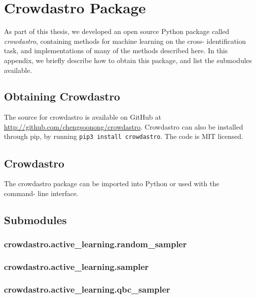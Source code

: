 
\appendix
\chapter{Crowdastro Package}

As part of this thesis, we developed an open source Python package called
\emph{crowdastro}, containing methods for machine learning on the cross-
identification task, and implementations of many of the methods described here.
In this appendix, we briefly describe how to obtain this package, and list the
submodules available.

\section{Obtaining Crowdastro}

    The source for crowdastro is available on GitHub at
    \url{http://github.com/chengsoonong/crowdastro}. Crowdastro can also be
    installed through pip, by running \texttt{pip3 install crowdastro}. The code
    is MIT licensed.

\section{Crowdastro}

    The crowdastro package can be imported into Python or used with the command-
    line interface.


\section{Submodules}
    \label{sec:crowdastro-submodules}

    \subsection{crowdastro.active\_learning.random\_sampler}
        \label{sec:crowdastro-random-sampler}
    \subsection{crowdastro.active\_learning.sampler}
        \label{sec:crowdastro-sampler}
    \subsection{crowdastro.active\_learning.qbc\_sampler}
        \label{sec:crowdastro-qbc-sampler}
